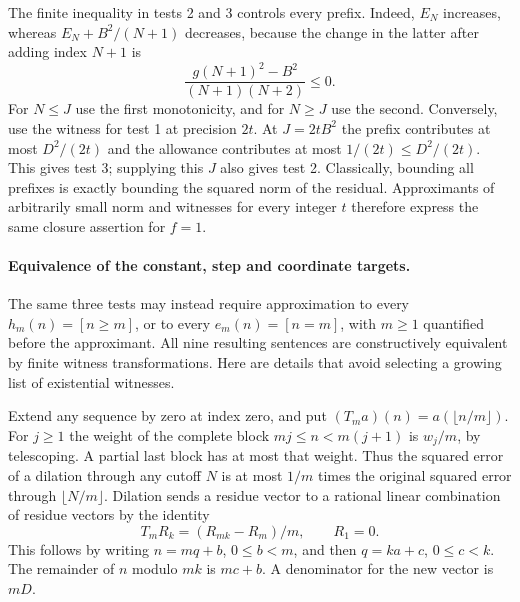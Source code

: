 The finite inequality in tests 2 and 3 controls every prefix. Indeed,
$E_N$ increases, whereas $E_N+B^2/(N+1)$ decreases, because the change in
the latter after adding index $N+1$ is
\[
       \frac{g(N+1)^2-B^2}{(N+1)(N+2)}\le0.
\]
For $N\le J$ use the first monotonicity, and for $N\ge J$ use the
second. Conversely, use the witness for test 1 at precision $2t$.
At $J=2tB^2$ the prefix contributes at most $D^2/(2t)$ and the
allowance contributes at most $1/(2t)\le D^2/(2t)$. This gives
test 3; supplying this $J$ also gives test 2. Classically, bounding all
prefixes is exactly bounding the squared norm of the residual. Approximants
of arbitrarily small norm and witnesses for every integer $t$ therefore
express the same closure assertion for $f=1$.

\paragraph{Equivalence of the constant, step and coordinate targets.}
The same three tests may instead require approximation to every
$h_m(n)=[n\ge m]$, or to every $e_m(n)=[n=m]$, with $m\ge1$ quantified
before the approximant. All nine resulting sentences are constructively
equivalent by finite witness transformations. Here are details that avoid
selecting a growing list of existential witnesses.

Extend any sequence by zero at index zero, and put
$(T_m a)(n)=a(\lfloor n/m\rfloor)$. For $j\ge1$ the weight of the complete
block $mj\le n<m(j+1)$ is $w_j/m$, by telescoping. A partial last block
has at most that weight. Thus the squared error of a dilation through any
cutoff $N$ is at most $1/m$ times the original squared error through
$\lfloor N/m\rfloor$. Dilation sends a residue vector to a rational linear
combination of residue vectors by the identity
\[
   T_mR_k=(R_{mk}-R_m)/m,\qquad R_1=0.
\]
This follows by writing $n=mq+b$, $0\le b<m$, and then
$q=ka+c$, $0\le c<k$. The remainder of $n$ modulo $mk$ is $mc+b$.
A denominator for the new vector is $mD$.

